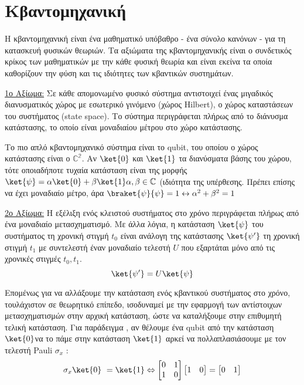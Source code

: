\chapter{Κβαντομηχανική}

Η κβαντομηχανική είναι ένα μαθηματικό υπόβαθρο - ένα σύνολο κανόνων - για τη κατασκευή φυσικών θεωριών. Τα αξιώματα της κβαντομηχανικής είναι ο συνδετικός κρίκος των μαθηματικών με την κάθε φυσική θεωρία και είναι εκείνα τα οποία καθορίζουν την φύση και τις ιδιότητες των κβαντικών συστημάτων.

\underline{1ο Αξίωμα:} Σε κάθε απομονωμένο φυσικό σύστημα αντιστοιχεί ένας μιγαδικός διανυσματικός χώρος με εσωτερικό γινόμενο (χώρος Hilbert), ο χώρος καταστάσεων του συστήματος (state space). Το σύστημα περιγράφεται πλήρως από το διάνυσμα κατάστασης, το οποίο είναι μοναδιαίου μέτρου στο χώρο κατάστασης.

Το πιο απλό κβαντομηχανικό σύστημα είναι το qubit, του οποίου ο χώρος κατάστασης είναι ο $\mathbb{C^2}$. Αν $\ket{0}$ και $\ket{1}$ τα διανύσματα βάσης του χώρου, τότε οποιαδήποτε τυχαία κατάσταση είναι της μορφής $\ket{\psi} = \alpha\ket{0} + \beta\ket{1} \alpha,\beta \in \mathbb{C}$ (ιδιότητα της υπέρθεσης. Πρέπει επίσης να έχει μοναδιαίο μέτρο, άρα $\braket{\psi}{\psi} = 1 \leftrightarrow \alpha^2 + \beta^2 = 1$

\underline{2ο Αξίωμα:} Η εξέλιξη ενός κλειστού συστήματος στο χρόνο περιγράφεται πλήρως από ένα μοναδιαίο μετασχηματισμό. Με άλλα λόγια, η κατάσταση $\ket{\psi}$ του συστήματος τη χρονική στιγμή $t_0$ είναι ανάλογη της κατάστασης $\ket{\psi'}$ τη χρονική στιγμή $t_1$ με συντελεστή έναν μοναδιαίο τελεστή $U$ που εξαρτάται μόνο από τις χρονικές στιγμές $t_0,t_1$. \[\ket{\psi'} = U \ket{\psi}\]

Επομένως για να αλλάξουμε την κατάσταση ενός κβαντικού συστήματος στο χρόνο, τουλάχιστον σε θεωρητικό επίπεδο, ισοδυναμεί με την εφαρμογή των αντίστοιχων μετασχηματισμών στην αρχική κατάσταση, ώστε να καταλήξουμε στην επιθυμητή τελική κατάσταση. Για παράδειγμα , αν θέλουμε ένα qubit από την κατάσταση $\ket{0}$να το πάμε στην κατάσταση $\ket{1}$ αρκεί να πολλαπλασιάσουμε με τον τελεστή Pauli $\sigma_x$ : \[ \sigma_x\ket{0}\ = \ket{1} \Leftrightarrow 
\begin{bmatrix}
0&1\\
1&0\\
\end{bmatrix} \begin{bmatrix}1&0\end{bmatrix} = \begin{bmatrix}0&1\end{bmatrix}  \]

